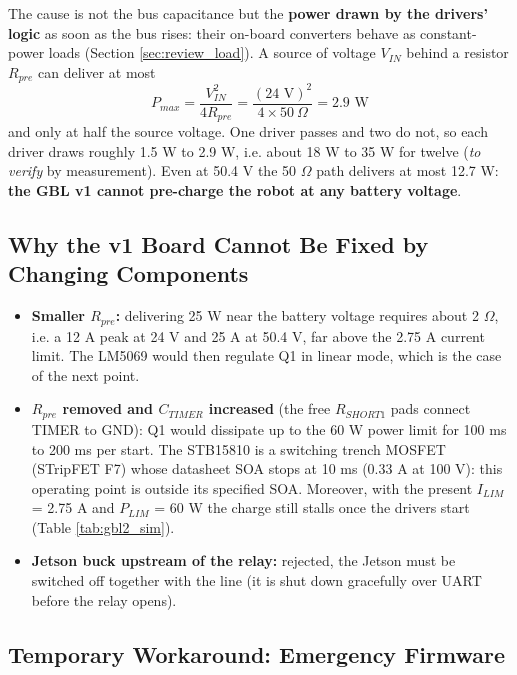 \documentclass[11pt,a4paper]{article}
\begin{document}
The cause is not the bus capacitance but the \textbf{power drawn by the drivers' logic} as soon as the bus rises: their on-board converters behave as constant-power loads (Section \ref{sec:review_load}). A source of voltage $V_{IN}$ behind a resistor $R_{pre}$ can deliver at most
\begin{equation}
P_{max} = \frac{V_{IN}^2}{4 R_{pre}} = \frac{(24 \text{ V})^2}{4 \times 50\ \Omega} = 2.9 \text{ W}
\end{equation}
and only at half the source voltage. One driver passes and two do not, so each driver draws roughly 1.5 W to 2.9 W, i.e. about 18 W to 35 W for twelve (\textit{to verify} by measurement). Even at 50.4 V the 50 $\Omega$ path delivers at most 12.7 W: \textbf{the GBL v1 cannot pre-charge the robot at any battery voltage}.

\subsection{Why the v1 Board Cannot Be Fixed by Changing Components}

\begin{itemize}
    \item \textbf{Smaller $R_{pre}$:} delivering 25 W near the battery voltage requires about 2 $\Omega$, i.e. a 12 A peak at 24 V and 25 A at 50.4 V, far above the 2.75 A current limit. The LM5069 would then regulate Q1 in linear mode, which is the case of the next point.
    \item \textbf{$R_{pre}$ removed and $C_{TIMER}$ increased} (the free $R_{SHORT1}$ pads connect TIMER to GND): Q1 would dissipate up to the 60 W power limit for 100 ms to 200 ms per start. The STB15810 is a switching trench MOSFET (STripFET F7) whose datasheet SOA stops at 10 ms (0.33 A at 100 V): this operating point is outside its specified SOA. Moreover, with the present $I_{LIM}$ = 2.75 A and $P_{LIM}$ = 60 W the charge still stalls once the drivers start (Table \ref{tab:gbl2_sim}).
    \item \textbf{Jetson buck upstream of the relay:} rejected, the Jetson must be switched off together with the line (it is shut down gracefully over UART before the relay opens).
\end{itemize}

\subsection{Temporary Workaround: Emergency Firmware}
\end{document}
